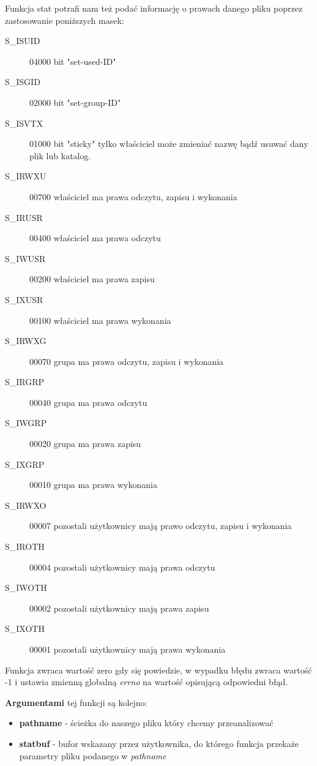 \documentclass{article}
\begin{document}
Funkcja stat potrafi nam też podać informację o prawach danego pliku poprzez zastosowanie poniższych masek:
\begin{description}

\item[S\_ISUID]	04000	bit "set-used-ID"
\item[S\_ISGID]	02000	bit "set-group-ID" 
\item[S\_ISVTX]	01000	bit "sticky" tylko właściciel może zmieniać nazwę bądź usuwać dany plik lub katalog.
\item[S\_IRWXU]	00700	właściciel ma prawa odczytu, zapisu i wykonania
\item[S\_IRUSR]	00400	właściciel ma prawa odczytu
\item[S\_IWUSR]	00200	właściciel ma prawa zapisu
\item[S\_IXUSR]	00100	właściciel ma prawa wykonania
\item[S\_IRWXG]	00070	grupa ma prawa odczytu, zapisu i wykonania
\item[S\_IRGRP]	00040	grupa ma prawa odczytu
\item[S\_IWGRP]	00020	grupa ma prawa zapisu
\item[S\_IXGRP]	00010	grupa ma prawa wykonania
\item[S\_IRWXO]	00007	pozostali użytkownicy mają prawo odczytu, zapisu i wykonania
\item[S\_IROTH]	00004	pozostali użytkownicy mają prawa odczytu
\item[S\_IWOTH]	00002	pozostali użytkownicy mają prawa zapisu
\item[S\_IXOTH]	00001	pozostali użytkownicy mają prawa wykonania
\end{description}

Funkcja zwraca wartość zero gdy się powiedzie, w wypadku błędu zwraca wartość -1 i ustawia zmienną globalną \textit{errno} na wartość opisującą odpowiedni błąd.

\textbf{Argumentami} tej funkcji są kolejno:
\begin{itemize}
\item \textbf{pathname} - ścieżka do naszego pliku który chcemy przeanalizować
\item \textbf{statbuf} - bufor wskazany przez użytkownika, do którego funkcja przekaże parametry pliku podanego w \textit{pathname}
\end{itemize}
\end{document}
